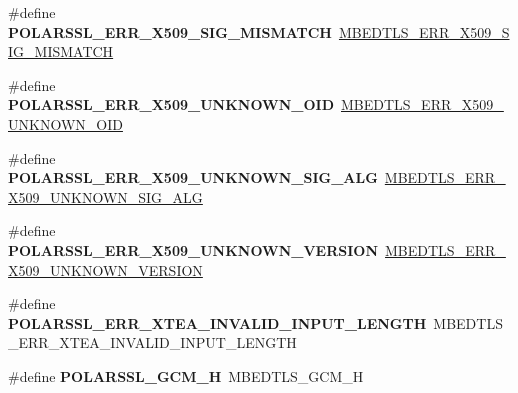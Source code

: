 \begin{DoxyCompactItemize}
\item 
\mbox{\label{compat-1_83_8h_ac00b6c62043eca7ddf8809888961454b}} 
\#define {\bfseries P\+O\+L\+A\+R\+S\+S\+L\+\_\+\+E\+R\+R\+\_\+\+X509\+\_\+\+S\+I\+G\+\_\+\+M\+I\+S\+M\+A\+T\+CH}~\mbox{\hyperlink{group__x509__module_gac489ce5e8ba417bcd86012ebbb7f5044}{M\+B\+E\+D\+T\+L\+S\+\_\+\+E\+R\+R\+\_\+\+X509\+\_\+\+S\+I\+G\+\_\+\+M\+I\+S\+M\+A\+T\+CH}}
\item 
\mbox{\label{compat-1_83_8h_a55c4c1d62914da0514be0e48c02a91f6}} 
\#define {\bfseries P\+O\+L\+A\+R\+S\+S\+L\+\_\+\+E\+R\+R\+\_\+\+X509\+\_\+\+U\+N\+K\+N\+O\+W\+N\+\_\+\+O\+ID}~\mbox{\hyperlink{group__x509__module_gab4e8e2e41bfe62e969343efaa2784103}{M\+B\+E\+D\+T\+L\+S\+\_\+\+E\+R\+R\+\_\+\+X509\+\_\+\+U\+N\+K\+N\+O\+W\+N\+\_\+\+O\+ID}}
\item 
\mbox{\label{compat-1_83_8h_a87606217fba12ea921df66f51ad8c2e9}} 
\#define {\bfseries P\+O\+L\+A\+R\+S\+S\+L\+\_\+\+E\+R\+R\+\_\+\+X509\+\_\+\+U\+N\+K\+N\+O\+W\+N\+\_\+\+S\+I\+G\+\_\+\+A\+LG}~\mbox{\hyperlink{group__x509__module_ga488f8616b42eae6fe3fb9815d43c976f}{M\+B\+E\+D\+T\+L\+S\+\_\+\+E\+R\+R\+\_\+\+X509\+\_\+\+U\+N\+K\+N\+O\+W\+N\+\_\+\+S\+I\+G\+\_\+\+A\+LG}}
\item 
\mbox{\label{compat-1_83_8h_a04dc192b55781ef24910bd1dfa53e6f3}} 
\#define {\bfseries P\+O\+L\+A\+R\+S\+S\+L\+\_\+\+E\+R\+R\+\_\+\+X509\+\_\+\+U\+N\+K\+N\+O\+W\+N\+\_\+\+V\+E\+R\+S\+I\+ON}~\mbox{\hyperlink{group__x509__module_gab80a4eb806328731def21ec2ebcbc365}{M\+B\+E\+D\+T\+L\+S\+\_\+\+E\+R\+R\+\_\+\+X509\+\_\+\+U\+N\+K\+N\+O\+W\+N\+\_\+\+V\+E\+R\+S\+I\+ON}}
\item 
\mbox{\label{compat-1_83_8h_a9c09eafcc6b5bacc7d3617daaf357727}} 
\#define {\bfseries P\+O\+L\+A\+R\+S\+S\+L\+\_\+\+E\+R\+R\+\_\+\+X\+T\+E\+A\+\_\+\+I\+N\+V\+A\+L\+I\+D\+\_\+\+I\+N\+P\+U\+T\+\_\+\+L\+E\+N\+G\+TH}~M\+B\+E\+D\+T\+L\+S\+\_\+\+E\+R\+R\+\_\+\+X\+T\+E\+A\+\_\+\+I\+N\+V\+A\+L\+I\+D\+\_\+\+I\+N\+P\+U\+T\+\_\+\+L\+E\+N\+G\+TH
\item 
\mbox{\label{compat-1_83_8h_a9f26a56af1554d78af1974bde5b84dcb}} 
\#define {\bfseries P\+O\+L\+A\+R\+S\+S\+L\+\_\+\+G\+C\+M\+\_\+H}~M\+B\+E\+D\+T\+L\+S\+\_\+\+G\+C\+M\+\_\+H
\item 

\end{DoxyCompactItemize}
